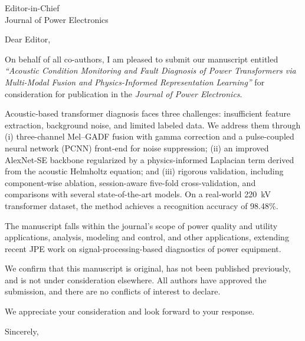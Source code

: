 \documentclass[a4paper,12pt]{letter}
\date{\today}
\begin{document}
	
\begin{letter}{
		Editor-in-Chief \\
		Journal of Power Electronics}

	
		\opening{Dear Editor,}
	
	On behalf of all co-authors, I am pleased to submit our manuscript entitled \textit{``Acoustic Condition Monitoring and Fault Diagnosis of Power Transformers via Multi-Modal Fusion and Physics-Informed Representation Learning''} for consideration for publication in the \textit{Journal of Power Electronics}.
	
	Acoustic-based transformer diagnosis faces three challenges: insufficient feature extraction, background noise, and limited labeled data. We address them through (i) three-channel Mel--GADF fusion with gamma correction and a pulse-coupled neural network (PCNN) front-end for noise suppression; (ii) an improved AlexNet-SE backbone regularized by a physics-informed Laplacian term derived from the acoustic Helmholtz equation; and (iii) rigorous validation, including component-wise ablation, session-aware five-fold cross-validation, and comparisons with several state-of-the-art models. On a real-world 220~kV transformer dataset, the method achieves a recognition accuracy of 98.48\%.
	
	The manuscript falls within the journal's scope of power quality and utility applications, analysis, modeling and control, and other applications, extending recent JPE work on signal-processing-based diagnostics of power equipment.
	
	We confirm that this manuscript is original, has not been published previously, and is not under consideration elsewhere. All authors have approved the submission, and there are no conflicts of interest to declare.
	
	We appreciate your consideration and look forward to your response.
	
	\closing{Sincerely,}
		
	\end{letter}
\end{document}

